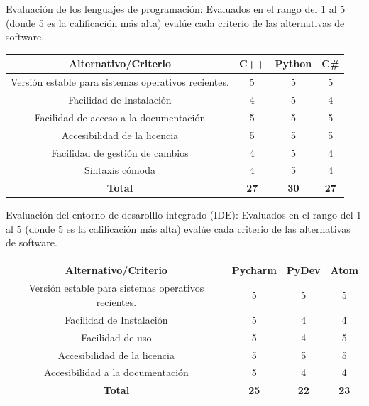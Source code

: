 \documentclass[12pt]{report}%
\begin{document}
Evaluación de los lenguajes de programación: Evaluados en el rango del 1 al 5 (donde 5 es la calificación más alta) evalúe cada criterio de las alternativas de software.

\begin{table}[htbp]
\begin{tabular}{|c|c|c|c|}
\hline
\rowcolor[HTML]{68CBD0} 
\textbf{Alternativo/Criterio}                       & \textbf{C++} & \textbf{Python} & \textbf{C\#} \\ \hline
Versión estable para sistemas operativos recientes. & 5            & 5               & 5            \\ \hline
Facilidad de Instalación                            & 4            & 5               & 4            \\ \hline
Facilidad de acceso a la documentación              & 5            & 5               & 5            \\ \hline
Accesibilidad de la licencia                        & 5            & 5               & 5            \\ \hline
Facilidad de gestión de cambios                     & 4            & 5               & 4            \\ \hline
Sintaxis cómoda                                     & 4            & 5               & 4            \\ \hline
\textbf{Total}                                      & \textbf{27}  & \textbf{30}     & \textbf{27}  \\ \hline
\end{tabular}
\end{table}

Evaluación del entorno de desarolllo integrado (IDE): Evaluados en el rango del 1 al 5 (donde 5 es la calificación más alta) evalúe cada criterio de las alternativas de software.

\begin{table}[htbp]
\begin{tabular}{|c|c|c|c|}
\hline
\rowcolor[HTML]{68CBD0} 
\textbf{Alternativo/Criterio}                       & \textbf{Pycharm} & \textbf{PyDev} & \textbf{Atom} \\ \hline
Versión estable para sistemas operativos recientes. & 5                & 5              & 5             \\ \hline
Facilidad de Instalación                            & 5                & 4              & 4             \\ \hline
Facilidad de uso                                    & 5                & 4              & 5             \\ \hline
Accesibilidad de la licencia                        & 5                & 5              & 5             \\ \hline
Accesibilidad a la documentación                    & 5                & 4              & 4             \\ \hline
\textbf{Total}                                      & \textbf{25}      & \textbf{22}    & \textbf{23}   \\ \hline
\end{tabular}
\end{table}
\end{document}
